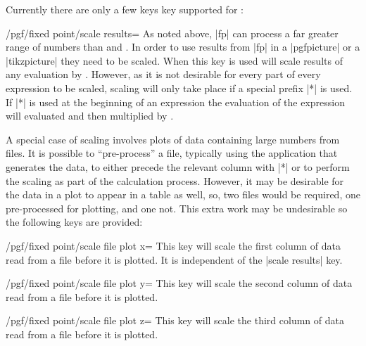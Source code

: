 Currently there are only a few keys key supported for :

\begin{key}{/pgf/fixed point/scale results=}
    As noted above, |fp| can process a far greater range of numbers than
    \pgfname{} and \tikzname{}. In order to use results from |fp| in a
    |{pgfpicture}| or a |{tikzpicture}| they need to be scaled. When this key
    is used \pgfname{} will scale results of any evaluation by .
    However, as it is not desirable for every part of every expression to be
    scaled, scaling will only take place if a special prefix |*| is used. If
    |*| is used at the beginning of an expression the evaluation of the
    expression will evaluated and then multiplied by .
\begin{codeexample}[]
\end{codeexample}

    A special case of scaling involves plots of data containing large numbers
    from files. It is possible to ``pre-process'' a file, typically using the
    application that generates the data, to either precede the relevant column
    with |*| or to perform the scaling as part of the calculation process.
    However, it may be desirable for the data in a plot to appear in a table as
    well, so, two files would be required, one pre-processed for plotting, and
    one not. This extra work may be undesirable so the following keys are
    provided:

    \begin{key}{/pgf/fixed point/scale file plot x=}
        This key will scale the first column of data read from a file before it
        is plotted. It is independent of the |scale results| key.
    \end{key}

    \begin{key}{/pgf/fixed point/scale file plot y=}
        This key will scale the second column of data read from a file before
        it is plotted.
    \end{key}

    \begin{key}{/pgf/fixed point/scale file plot z=}
        This key will scale the third column of data read from a file before it
        is plotted.
    \end{key}
\end{key}
